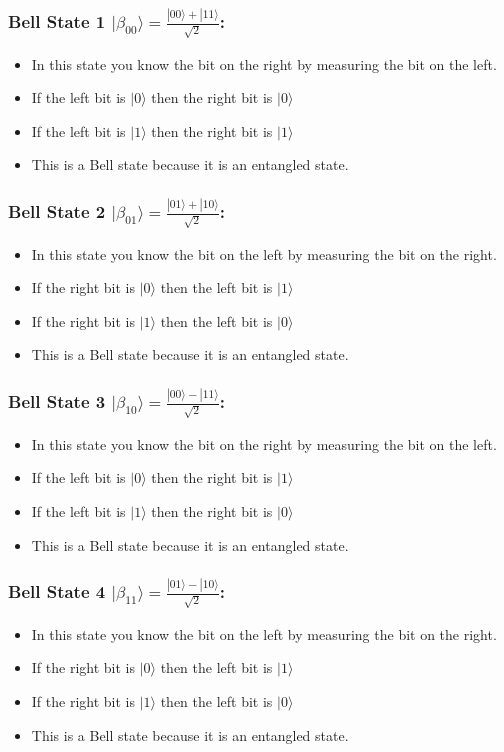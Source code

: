 \documentclass{article}
\begin{document}
\subsubsection{Bell State 1 \(|\beta_{00}\rangle = \frac{|00\rangle + |11\rangle}{\sqrt{2}}\):}
\begin{itemize}
    \item In this state you know the bit on the right by measuring the bit on the left.
    \item If the left bit is \(|0\rangle\) then the right bit is \(|0\rangle\)
    \item If the left bit is \(|1\rangle\) then the right bit is \(|1\rangle\)
    \item This is a Bell state because it is an entangled state.
\end{itemize}
\subsubsection{Bell State 2 \(|\beta_{01}\rangle = \frac{|01\rangle + |10\rangle}{\sqrt{2}}\):}
\begin{itemize}
    \item In this state you know the bit on the left by measuring the bit on the right.
    \item If the right bit is \(|0\rangle\) then the left bit is \(|1\rangle\)
    \item If the right bit is \(|1\rangle\) then the left bit is \(|0\rangle\)
    \item This is a Bell state because it is an entangled state.
\end{itemize}
\subsubsection{Bell State 3 \(|\beta_{10}\rangle = \frac{|00\rangle - |11\rangle}{\sqrt{2}}\):}
\begin{itemize}
    \item In this state you know the bit on the right by measuring the bit on the left.
    \item If the left bit is \(|0\rangle\) then the right bit is \(|1\rangle\)
    \item If the left bit is \(|1\rangle\) then the right bit is \(|0\rangle\)
    \item This is a Bell state because it is an entangled state.
\end{itemize}
\subsubsection{Bell State 4 \(|\beta_{11}\rangle = \frac{|01\rangle - |10\rangle}{\sqrt{2}}\):}
\begin{itemize}
    \item In this state you know the bit on the left by measuring the bit on the right.
    \item If the right bit is \(|0\rangle\) then the left bit is \(|1\rangle\)
    \item If the right bit is \(|1\rangle\) then the left bit is \(|0\rangle\)
    \item This is a Bell state because it is an entangled state.
\end{itemize}
\end{document}
